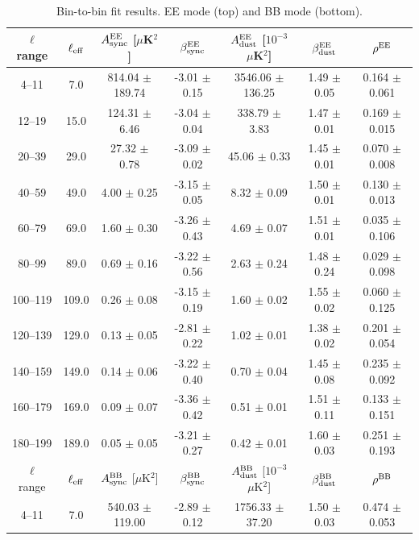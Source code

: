 \begin{table}[htbp]
\centering
\caption{Bin-to-bin fit results. EE mode (top) and BB mode (bottom).}
\label{tab:bin_to_bin_results_full_bin4-199}
\begin{tabular}{c c c c c c c}
\hline\hline
$\ell$ range & $\ell_{\rm eff}$ & $A^{\rm EE}_{\rm sync}$ [$\mu$K$^2$] & $\beta^{\rm EE}_{\rm sync}$ & $A^{\rm EE}_{\rm dust}$ [$10^{-3}$ $\mu$K$^2$] & $\beta^{\rm EE}_{\rm dust}$ & $\rho^{\rm EE}$ \\
\hline
4--11 & 7.0 & 814.04 $\pm$ 189.74 & -3.01 $\pm$ 0.15 & 3546.06 $\pm$ 136.25 & 1.49 $\pm$ 0.05 & 0.164 $\pm$ 0.061 \\
12--19 & 15.0 & 124.31 $\pm$ 6.46 & -3.04 $\pm$ 0.04 & 338.79 $\pm$ 3.83 & 1.47 $\pm$ 0.01 & 0.169 $\pm$ 0.015 \\
20--39 & 29.0 & 27.32 $\pm$ 0.78 & -3.09 $\pm$ 0.02 & 45.06 $\pm$ 0.33 & 1.45 $\pm$ 0.01 & 0.070 $\pm$ 0.008 \\
40--59 & 49.0 & 4.00 $\pm$ 0.25 & -3.15 $\pm$ 0.05 & 8.32 $\pm$ 0.09 & 1.50 $\pm$ 0.01 & 0.130 $\pm$ 0.013 \\
60--79 & 69.0 & 1.60 $\pm$ 0.30 & -3.26 $\pm$ 0.43 & 4.69 $\pm$ 0.07 & 1.51 $\pm$ 0.01 & 0.035 $\pm$ 0.106 \\
80--99 & 89.0 & 0.69 $\pm$ 0.16 & -3.22 $\pm$ 0.56 & 2.63 $\pm$ 0.24 & 1.48 $\pm$ 0.24 & 0.029 $\pm$ 0.098 \\
100--119 & 109.0 & 0.26 $\pm$ 0.08 & -3.15 $\pm$ 0.19 & 1.60 $\pm$ 0.02 & 1.55 $\pm$ 0.02 & 0.060 $\pm$ 0.125 \\
120--139 & 129.0 & 0.13 $\pm$ 0.05 & -2.81 $\pm$ 0.22 & 1.02 $\pm$ 0.01 & 1.38 $\pm$ 0.02 & 0.201 $\pm$ 0.054 \\
140--159 & 149.0 & 0.14 $\pm$ 0.06 & -3.22 $\pm$ 0.40 & 0.70 $\pm$ 0.04 & 1.45 $\pm$ 0.08 & 0.235 $\pm$ 0.092 \\
160--179 & 169.0 & 0.09 $\pm$ 0.07 & -3.36 $\pm$ 0.42 & 0.51 $\pm$ 0.01 & 1.51 $\pm$ 0.11 & 0.133 $\pm$ 0.151 \\
180--199 & 189.0 & 0.05 $\pm$ 0.05 & -3.21 $\pm$ 0.27 & 0.42 $\pm$ 0.01 & 1.60 $\pm$ 0.03 & 0.251 $\pm$ 0.193 \\
\hline
$\ell$ range & $\ell_{\rm eff}$ & $A^{\rm BB}_{\rm sync}$ [$\mu$K$^2$] & $\beta^{\rm BB}_{\rm sync}$ & $A^{\rm BB}_{\rm dust}$ [$10^{-3}$ $\mu$K$^2$] & $\beta^{\rm BB}_{\rm dust}$ & $\rho^{\rm BB}$ \\
\hline
4--11 & 7.0 & 540.03 $\pm$ 119.00 & -2.89 $\pm$ 0.12 & 1756.33 $\pm$ 37.20 & 1.50 $\pm$ 0.03 & 0.474 $\pm$ 0.053 \\

\end{tabular}
\end{table}
